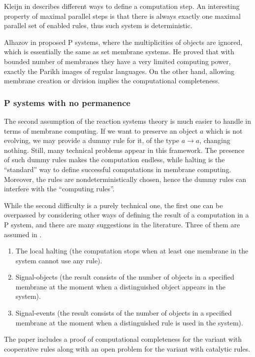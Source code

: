 Kleijn in \cite{Kleijn11SetMembrane} describes different ways to define a computation step. An interesting property of maximal parallel steps is that there is always exactly one maximal parallel set of enabled rules, thus such system is deterministic.

Alhazov in \cite{Alhazov05WithoutMultiplicities} proposed P systems, where the multiplicities of objects are ignored, which is essentially the same as set membrane systems. He proved that with bounded number of membranes they have a very limited computing power, exactly the Parikh images of regular languages. On the other hand, allowing membrane creation or division implies the computational completeness.


\subsubsection{P systems with no permanence} %
\label{ssub:p_systems_with_no_permanence}

The second assumption of the reaction systems theory is much easier to handle in terms of membrane computing. If we want to preserve an object $a$ which is not evolving, we may provide a dummy rule for it, of the type $a\rightarrow a$, changing nothing. Still, many technical problems appear in this framework. The presence of such dummy rules makes the computation endless, while halting is the ``standard'' way to define successful computations in membrane computing. Moreover, the rules are nondeterministically chosen, hence the dummy rules can interfere with the ``computing rules''.

While the second difficulty is a purely technical one, the first one can be overpassed by considering other ways of defining the result of a computation in a P system, and there are many suggestions in the literature. Three of them are assumed in \cite{Paun12BridgingReactionSystems}.
\begin{enumerate}
  \item The local halting (the computation stops when at least one membrane in the system cannot use any rule).
  \item Signal-objects (the result consists of the number of objects in a specified membrane at the moment when a distinguished object appears in the system).
  \item Signal-events (the result consists of the number of objects in a specified membrane at the moment when a distinguished rule is used in the system).
\end{enumerate}

The paper \cite{Paun12BridgingReactionSystems} includes a proof of computational completeness for the variant with cooperative rules along with an open problem for the variant with catalytic rules.


